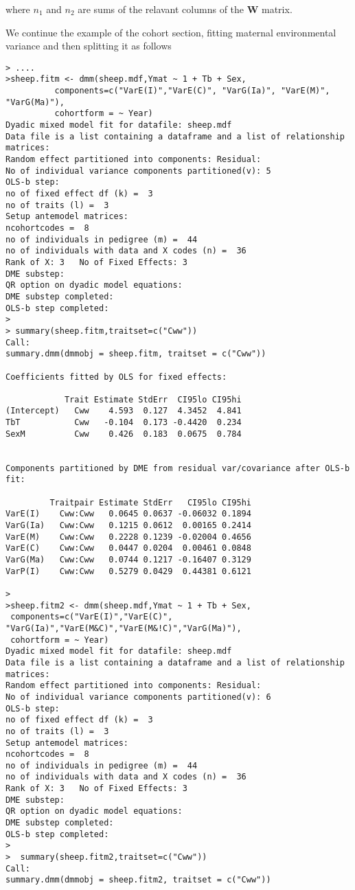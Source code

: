 \documentclass[titlepage]{article}  %
\begin{document}
where $n_{1}$ and $n_{2}$ are sums of the relavant columns of the $\bm{W}$ matrix.


We continue the example of the cohort section, fitting maternal environmental variance and then splitting it  as follows

\begin{verbatim}
> ....
>sheep.fitm <- dmm(sheep.mdf,Ymat ~ 1 + Tb + Sex,
          components=c("VarE(I)","VarE(C)", "VarG(Ia)", "VarE(M)", "VarG(Ma)"),
          cohortform = ~ Year)
Dyadic mixed model fit for datafile: sheep.mdf  
Data file is a list containing a dataframe and a list of relationship matrices:
Random effect partitioned into components: Residual:
No of individual variance components partitioned(v): 5 
OLS-b step:
no of fixed effect df (k) =  3 
no of traits (l) =  3 
Setup antemodel matrices:
ncohortcodes =  8 
no of individuals in pedigree (m) =  44 
no of individuals with data and X codes (n) =  36 
Rank of X: 3   No of Fixed Effects: 3 
DME substep:
QR option on dyadic model equations:
DME substep completed:
OLS-b step completed:
>
> summary(sheep.fitm,traitset=c("Cww"))
Call:
summary.dmm(dmmobj = sheep.fitm, traitset = c("Cww"))

Coefficients fitted by OLS for fixed effects:

            Trait Estimate StdErr  CI95lo CI95hi
(Intercept)   Cww    4.593  0.127  4.3452  4.841
TbT           Cww   -0.104  0.173 -0.4420  0.234
SexM          Cww    0.426  0.183  0.0675  0.784


Components partitioned by DME from residual var/covariance after OLS-b fit:

         Traitpair Estimate StdErr   CI95lo CI95hi
VarE(I)    Cww:Cww   0.0645 0.0637 -0.06032 0.1894
VarG(Ia)   Cww:Cww   0.1215 0.0612  0.00165 0.2414
VarE(M)    Cww:Cww   0.2228 0.1239 -0.02004 0.4656
VarE(C)    Cww:Cww   0.0447 0.0204  0.00461 0.0848
VarG(Ma)   Cww:Cww   0.0744 0.1217 -0.16407 0.3129
VarP(I)    Cww:Cww   0.5279 0.0429  0.44381 0.6121

> 
>sheep.fitm2 <- dmm(sheep.mdf,Ymat ~ 1 + Tb + Sex,
 components=c("VarE(I)","VarE(C)", "VarG(Ia)","VarE(M&C)","VarE(M&!C)","VarG(Ma)"),
 cohortform = ~ Year)
Dyadic mixed model fit for datafile: sheep.mdf  
Data file is a list containing a dataframe and a list of relationship matrices:
Random effect partitioned into components: Residual:
No of individual variance components partitioned(v): 6 
OLS-b step:
no of fixed effect df (k) =  3 
no of traits (l) =  3 
Setup antemodel matrices:
ncohortcodes =  8 
no of individuals in pedigree (m) =  44 
no of individuals with data and X codes (n) =  36 
Rank of X: 3   No of Fixed Effects: 3 
DME substep:
QR option on dyadic model equations:
DME substep completed:
OLS-b step completed:
> 
>  summary(sheep.fitm2,traitset=c("Cww"))
Call:
summary.dmm(dmmobj = sheep.fitm2, traitset = c("Cww"))


\end{verbatim}
\end{document}
